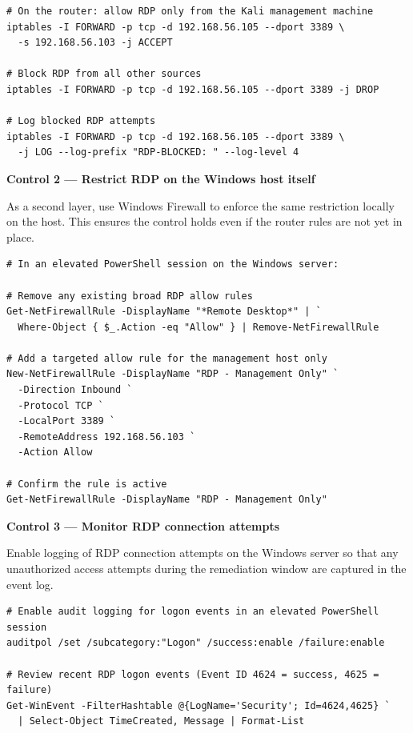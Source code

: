 \documentclass[12pt]{article}
\begin{document}
\begin{lstlisting}[style=terminal]
# On the router: allow RDP only from the Kali management machine
iptables -I FORWARD -p tcp -d 192.168.56.105 --dport 3389 \
  -s 192.168.56.103 -j ACCEPT
 
# Block RDP from all other sources
iptables -I FORWARD -p tcp -d 192.168.56.105 --dport 3389 -j DROP
 
# Log blocked RDP attempts
iptables -I FORWARD -p tcp -d 192.168.56.105 --dport 3389 \
  -j LOG --log-prefix "RDP-BLOCKED: " --log-level 4
\end{lstlisting}
 
\bigskip
\noindent\textbf{Control 2 --- Restrict RDP on the Windows host itself}
 
As a second layer, use Windows Firewall to enforce the same restriction
locally on the host. This ensures the control holds even if the router
rules are not yet in place.
 
\begin{lstlisting}[style=terminal]
# In an elevated PowerShell session on the Windows server:
 
# Remove any existing broad RDP allow rules
Get-NetFirewallRule -DisplayName "*Remote Desktop*" | `
  Where-Object { $_.Action -eq "Allow" } | Remove-NetFirewallRule
 
# Add a targeted allow rule for the management host only
New-NetFirewallRule -DisplayName "RDP - Management Only" `
  -Direction Inbound `
  -Protocol TCP `
  -LocalPort 3389 `
  -RemoteAddress 192.168.56.103 `
  -Action Allow
 
# Confirm the rule is active
Get-NetFirewallRule -DisplayName "RDP - Management Only"
\end{lstlisting}
 
\bigskip
\noindent\textbf{Control 3 --- Monitor RDP connection attempts}
 
Enable logging of RDP connection attempts on the Windows server so that any
unauthorized access attempts during the remediation window are captured in
the event log.
 
\begin{lstlisting}[style=terminal]
# Enable audit logging for logon events in an elevated PowerShell session
auditpol /set /subcategory:"Logon" /success:enable /failure:enable
 
# Review recent RDP logon events (Event ID 4624 = success, 4625 = failure)
Get-WinEvent -FilterHashtable @{LogName='Security'; Id=4624,4625} `
  | Select-Object TimeCreated, Message | Format-List
\end{lstlisting}
 
\end{document}
